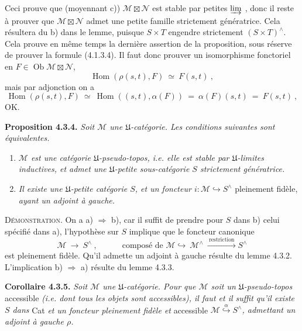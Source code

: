 \documentclass[11pt]{article}
\newcommand{\printedpage}[1]{\marginpar{\footnotesize p.~#1}}
\newcommand{\msp}[1]{\marginpar{\footnotesize [#1]}}
\newcommand{\Hom}{\operatorname{Hom}}
\newcommand{\Ob}{\operatorname{Ob}}
\begin{document}
\noindent Ceci prouve que (moyennant c)) $\mathcal M\boxtimes\mathcal N$ est stable par petites $\varinjlim$ , donc il reste à prouver que $\mathcal M\boxtimes\mathcal N$ admet une petite famille strictement génératrice. Cela résultera du b) dans le lemme, puisque $S\times T$ engendre strictement $(S\times T)^\wedge$. Cela prouve en même temps la dernière assertion de la proposition, sous réserve de prouver la formule (4.1.3.4). Il faut donc prouver un isomorphisme fonctoriel en $F\in\Ob\mathcal M\boxtimes\mathcal N$, %
\[
\Hom(\rho(s,t),F)\ \simeq\ F(s,t)\ ,
\]
mais par adjonction on a
\[
\Hom(\rho(s,t),F)\ \simeq\ \Hom((s,t),\alpha(F))\ =\ \alpha(F)(s,t)\ =\ F(s,t)\ ,
\]
OK.

\printedpage{11}

\noindent\msp{page 69}\textbf{Proposition 4.3.4.} \textit{Soit $\mathcal M$ une $\mathfrak U$-catégorie. Les conditions suivantes sont équivalentes.}
\begin{enumerate}[label={}]
\item[\textit{a)}] \textit{$\mathcal M$ est une catégorie $\mathfrak U$-pseudo-topos, i.e. elle est stable par $\mathfrak U$-limites inductives, et admet une $\mathfrak U$-petite sous-catégorie $S$ strictement génératrice.}
\item[\textit{b)}] \textit{Il existe une $\mathfrak U$-petite catégorie $S$, et un foncteur $i:\mathcal M\hookrightarrow S^\wedge$} pleinement fidèle, \textit{ayant un adjoint à gauche.}
\end{enumerate}

\noindent\textsc{Démonstration}. On a a) $\Longrightarrow$ b), car il suffit de prendre pour $S$ dans b) celui spécifié dans a), l'hypothèse sur $S$ implique que le foncteur canonique
\[
\mathcal M\ \longrightarrow\ S^\wedge\ ,\qquad\quad \text{composé de } \mathcal M\hookrightarrow\ \mathcal M^\wedge\ \xrightarrow{\ \text{restriction}\ }S^\wedge
\]
est pleinement fidèle. Qu'il admette un adjoint à gauche résulte du lemme 4.3.2. L'implication b) $\Longrightarrow$ a) résulte du lemme 4.3.3.

\noindent\textbf{Corollaire 4.3.5.} \textit{Soit $\mathcal M$ une $\mathfrak U$-catégorie. Pour que $\mathcal M$ soit un $\mathfrak U$-pseudo-topos} accessible \textit{(i.e. dont tous les objets sont accessibles), il faut et il suffit qu'il existe $S$ dans} Cat \textit{et un foncteur pleinement fidèle et} accessible $\mathcal M\overset{\alpha}{\hookrightarrow}S^\wedge$\textit{, admettant un adjoint à gauche $\rho$.}
\end{document}
